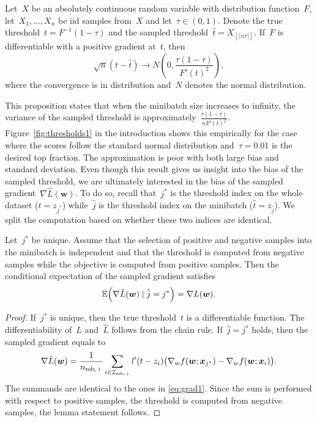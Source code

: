 \begin{proposition}\label{proposition:bound}
  Let~$X$ be an absolutely continuous random variable with distribution function~$F$, let~$X_1,\dots,X_n$ be iid samples from~$X$ and let~$\tau\in(0,1)$. Denote the true threshold~$t=F^{-1}(1-\tau)$ and the sampled threshold~$\hat t=X_{[\lceil n\tau\rceil]}$. If~$F$ is differentiable with a positive gradient at~$t$, then
  \begin{equation*}
    \sqrt{n}(t - \hat t) \rightarrow N\left(0, \frac{\tau(1-\tau)}{F'(t)^2}\right),
  \end{equation*}
  where the convergence is in distribution and~$N$ denotes the normal distribution.
\end{proposition}

This proposition states that when the minibatch size increases to infinity, the variance of the sampled threshold is approximately~$\frac{\tau(1-\tau)}{nF'(t)^2}$. Figure~\ref{fig:thresholds1} in the introduction shows this empirically for the case where the scores follow the standard normal distribution and~$\tau=0.01$ is the desired top fraction. The approximation is poor with both large bias and standard deviation. Even though this result gives us insight into the bias of the sampled threshold, we are ultimately interested in the bias of the sampled gradient~$\nabla \hat L(\bm{w})$. To do so, recall that~$j^*$ is the threshold index on the whole dataset ($t=z_{j^*}$) while~$\hat j$ is the threshold index on the minibatch ($\hat t=z_{\hat j}$). We split the computation based on whether these two indices are identical.

\begin{lemma}\label{lemma:convergence}
  Let~$j^*$ be unique. Assume that the selection of positive and negative samples into the minibatch is independent and that the threshold is computed from negative samples while the objective is computed from positive samples. Then the conditional expectation of the sampled gradient satisfies
  \begin{equation*}
    \EE\Brac{\nabla \hat L(\bm{w}) \mid \hat j=j^*} =  \nabla L(\bm{w}).
  \end{equation*}
\end{lemma}
\begin{proof}
  If~$j^*$ is unique, then the true threshold~$t$ is a differentiable function. The differentiability of~$L$ and~$\hat L$ follows from the chain rule. If~$\hat j=j^*$ holds, then the sampled gradient equals to
  \begin{equation}\label{eq:grad_min_aux}
    \nabla \hat L(\bm{w})= \frac{1}{n_{\text{mb},+}}\sum_{i\in \mathcal{I}_{\text{mb},+}}l'(t-z_i)\big(\nabla_w f(\bm{w};\bm{x}_{j^*}) - \nabla_w f(\bm{w};\bm{x}_i) \big).
  \end{equation}
  The summands are identical to the ones in \eqref{eq:grad1}. Since the sum is performed with respect to positive samples, the threshold is computed from negative samples, the lemma statement follows.
\end{proof}

